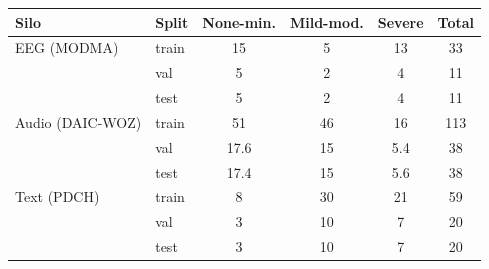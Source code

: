 \begin{tabular}{llcccc}
\toprule
\textbf{Silo} & \textbf{Split} & \textbf{None-min.} & \textbf{Mild-mod.} & \textbf{Severe} & \textbf{Total} \\
\midrule
EEG (MODMA) & train & 15 & 5 & 13 & 33 \\
 & val & 5 & 2 & 4 & 11 \\
 & test & 5 & 2 & 4 & 11 \\
\midrule
Audio (DAIC-WOZ) & train & 51 & 46 & 16 & 113 \\
 & val & 17.6 & 15 & 5.4 & 38 \\
 & test & 17.4 & 15 & 5.6 & 38 \\
\midrule
Text (PDCH) & train & 8 & 30 & 21 & 59 \\
 & val & 3 & 10 & 7 & 20 \\
 & test & 3 & 10 & 7 & 20 \\
\bottomrule
\end{tabular}